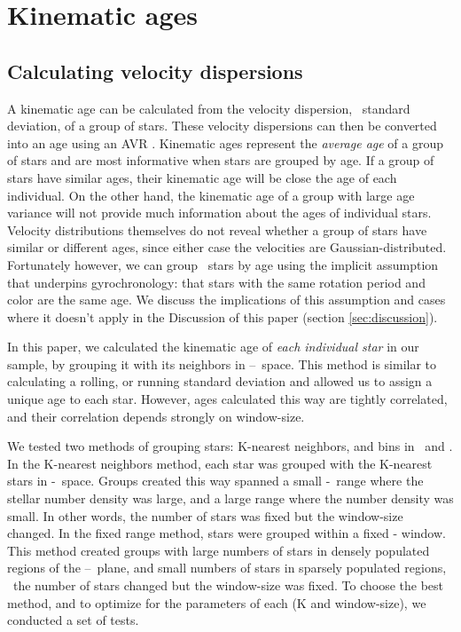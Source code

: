 \section{Kinematic ages}
\subsection{Calculating velocity dispersions}
\label{sec:velocity_dispersion}

A kinematic age can be calculated from the velocity dispersion, \ie\ standard
deviation, of a group of stars.
These velocity dispersions can then be converted into an age using an AVR
\citep[\eg][]{holmberg2009, yu2018}.
Kinematic ages represent the {\it average age} of a group of stars and are
most informative when stars are grouped by age.
If a group of stars have similar ages, their kinematic age will be close
the age of each individual.
On the other hand, the kinematic age of a group with large age variance will
not provide much information about the ages of individual stars.
Velocity distributions themselves do not reveal whether a group of stars have
similar or different ages, since either case the velocities are
Gaussian-distributed.
Fortunately however, we can group \kepler\ stars by age using the implicit
assumption that underpins gyrochronology: that stars with the same rotation
period and color are the same age.
We discuss the implications of this assumption and cases where it doesn't
apply in the Discussion of this paper (section \ref{sec:discussion}).

In this paper, we calculated the kinematic age of {\it each individual star}
in our sample, by grouping it with its neighbors in \logp--\teff\ space.
This method is similar to calculating a rolling, or running standard
deviation and allowed us to assign a unique age to each star.
However, ages calculated this way are tightly correlated, and their
correlation depends strongly on window-size.

We tested two methods of grouping stars: K-nearest neighbors, and bins in
\logp\ and \teff .
In the K-nearest neighbors method, each star was grouped with the K-nearest
stars in \logp-\teff\ space.
Groups created this way spanned a small \logp -\teff\ range where the stellar
number density was large, and a large range where the number density was
small.
In other words, the number of stars was fixed but the window-size changed.
In the fixed range method, stars were grouped within a fixed \logp -\teff
window.
This method created groups with large numbers of stars in densely populated
regions of the \logp--\teff\ plane, and small numbers of stars in sparsely
populated regions, \ie\ the number of stars changed but the window-size was
fixed.
To choose the best method, and to optimize for the parameters of each (K and
window-size), we conducted a set of tests.


